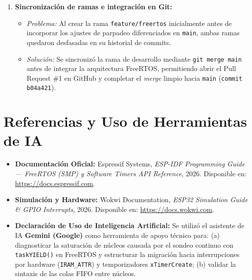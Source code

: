 \documentclass[10pt, letterpaper]{article}
\begin{document}
\begin{enumerate}
    \item \textbf{Sincronización de ramas e integración en Git:}
    \begin{itemize}\setlength{\itemsep}{1pt}
        \item \textit{Problema:} Al crear la rama \texttt{feature/freertos} inicialmente antes de incorporar los ajustes de parpadeo diferenciados en \texttt{main}, ambas ramas quedaron desfasadas en su historial de commits.
        \item \textit{Solución:} Se sincronizó la rama de desarrollo mediante \texttt{git merge main} antes de integrar la arquitectura FreeRTOS, permitiendo abrir el Pull Request \#1 en GitHub y completar el \textit{merge} limpio hacia \texttt{main} (\texttt{commit b04a421}).
    \end{itemize}
\end{enumerate}

\section{Referencias y Uso de Herramientas de IA}

\begin{itemize}\setlength{\itemsep}{1pt}\setlength{\parskip}{0pt}
    \item \textbf{Documentación Oficial:} Espressif Systems, \textit{ESP-IDF Programming Guide — FreeRTOS (SMP) y Software Timers API Reference}, 2026. Disponible en: \href{https://docs.espressif.com}{https://docs.espressif.com}.
    \item \textbf{Simulación y Hardware:} Wokwi Documentation, \textit{ESP32 Simulation Guide \& GPIO Interrupts}, 2026. Disponible en: \href{https://docs.wokwi.com}{https://docs.wokwi.com}.
    \item \textbf{Declaración de Uso de Inteligencia Artificial:} Se utilizó el asistente de IA \textbf{Gemini (Google)} como herramienta de apoyo técnico para: (a) diagnosticar la saturación de núcleos causada por el sondeo continuo con \texttt{taskYIELD()} en FreeRTOS y estructurar la migración hacia interrupciones por hardware (\texttt{IRAM\_ATTR}) y temporizadores \texttt{xTimerCreate}; (b) validar la sintaxis de las colas FIFO entre núcleos.
\end{itemize}
\end{document}
